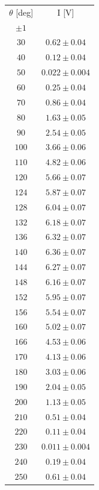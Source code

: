 \documentclass[10pt,oneside,a4paper]{article}
\begin{document}
\begin{table}[H]
\centering
{}
\label{tab:malus1}
\begin{tabular}{cc}
\hline
 $\theta$ [deg]& I [V]\\
 $\pm 1$ & \\
\hline
 $ 30  $& $  0.62  \pm  0.04 $\\
 $  40 $  &$ 0.12\pm    0.04  $\\
 $  50  $& $ 0.022 \pm  0.004$\\
 $  60 $ &$  0.25 \pm  0.04 $\\
  $  70  $ & $ 0.86 \pm 0.04 $\\
 $  80 $ &$  1.63 \pm  0.05 $\\
 $  90 $ &$  2.54 \pm  0.05 $ \\
 $ 100$ &$  3.66 \pm  0.06 $\\
 $ 110$ &$  4.82 \pm  0.06 $\\
 $ 120$ &$  5.66 \pm  0.07  $\\
 $ 124$ &$  5.87 \pm  0.07 $\\
 $ 128$ &$  6.04 \pm  0.07 $\\
 $ 132$ &$  6.18 \pm  0.07 $\\
 $ 136$ &$  6.32 \pm  0.07 $\\
 $ 140$ &$  6.36 \pm  0.07 $\\
 $ 144$ &$  6.27 \pm  0.07 $\\
 $ 148$ &$  6.16 \pm  0.07 $\\
 $ 152$ &$  5.95 \pm  0.07 $\\
 $ 156$ &$  5.54 \pm  0.07 $\\
 $ 160$ &$  5.02 \pm  0.07 $\\
 $ 166$ &$  4.53 \pm  0.06 $\\
 $ 170$ &$ 4.13 \pm  0.06 $ \\
 $ 180$ &$  3.03 \pm  0.06 $\\
 $ 190$ &$  2.04 \pm  0.05 $\\
 $ 200$ &$  1.13 \pm  0.05 $\\
 $ 210$ &$  0.51 \pm  0.04 $\\
 $ 220$ &$  0.11 \pm  0.04$ \\
 $ 230$ &$  0.011 \pm 0.004 $\\
 $ 240$ &$  0.19 \pm  0.04 $\\
 $ 250$ &$  0.61 \pm  0.04 $\\
\hline
\end{tabular}
\end{table}
\end{document}
